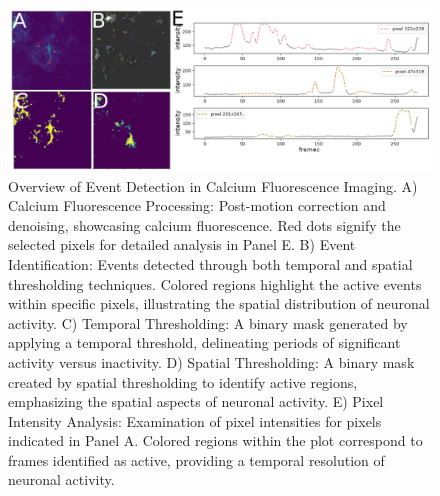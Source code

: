 \begin{figure}[h!]
\begin{center}
\includegraphics[width=\linewidth]{figures/5.png}
\end{center}
\caption{Overview of Event Detection in Calcium Fluorescence Imaging. A) Calcium Fluorescence Processing: Post-motion correction and denoising, showcasing calcium fluorescence. Red dots signify the selected pixels for detailed analysis in Panel E. B) Event Identification: Events detected through both temporal and spatial thresholding techniques. Colored regions highlight the active events within specific pixels, illustrating the spatial distribution of neuronal activity. C) Temporal Thresholding: A binary mask generated by applying a temporal threshold, delineating periods of significant activity versus inactivity. D) Spatial Thresholding: A binary mask created by spatial thresholding to identify active regions, emphasizing the spatial aspects of neuronal activity. E) Pixel Intensity Analysis: Examination of pixel intensities for pixels indicated in Panel A. Colored regions within the plot correspond to frames identified as active, providing a temporal resolution of neuronal activity.}\label{fig:5}
\end{figure}

